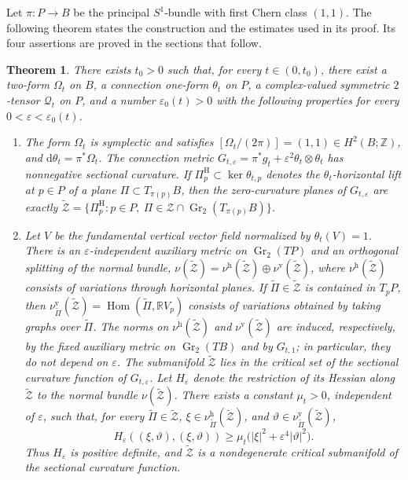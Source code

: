 \documentclass[11pt]{article}
\newtheorem{theorem}{Theorem}[section]
\theoremstyle{definition}
\theoremstyle{remark}
\newcommand{\R}{\mathbb R}
\newcommand{\Z}{\mathbb Z}
\newcommand{\cZ}{\mathcal Z}
\newcommand{\tZ}{\widetilde{\mathcal Z}}
\newcommand{\Gr}{\operatorname{Gr}}
\newcommand{\dd}{\mathrm d}
\newcommand{\eps}{\varepsilon}
\begin{document}
Let $\pi:P\to B$ be the principal $S^1$-bundle with first Chern class
$(1,1)$.  The following theorem states the construction and the estimates used
in its proof.  Its four assertions are proved in the sections that follow.

\begin{theorem}                                                                     \label{thm:construction}
There exists $t_0>0$ such that, for every $t\in(0,t_0)$, there exist a two-form
$\Omega_t$ on $B$, a connection one-form $\theta_t$ on $P$, a complex-valued
symmetric $2$-tensor $\mathcal Q_t$ on $P$, and a number
$\eps_0(t)>0$ with the following properties for every
$0<\eps<\eps_0(t)$.

\begin{enumerate}
\item The form $\Omega_t$ is symplectic and satisfies
$[\Omega_t/(2\pi)]=(1,1)\in H^2(B;\Z)$, and
$\dd\theta_t=\pi^*\Omega_t$.  The connection metric
$G_{t,\eps}=\pi^*g_t+\eps^2\theta_t\otimes\theta_t$ has nonnegative
sectional curvature.  If $\Pi_p^{\mathrm H}\subset\ker\theta_{t,p}$ denotes the
$\theta_t$-horizontal lift at $p\in P$ of a plane
$\Pi\subset T_{\pi(p)}B$, then the zero-curvature planes of $G_{t,\eps}$ are
exactly $\tZ=\{\Pi_p^{\mathrm H}:p\in P,\ \Pi\in\cZ\cap\Gr_2(T_{\pi(p)}B)\}$.

\item Let $V$ be the fundamental vertical vector field normalized by
$\theta_t(V)=1$.  There is an
$\eps$-independent auxiliary metric on $\Gr_2(TP)$ and an orthogonal
splitting of the normal bundle,
$\nu(\tZ)=\nu^{\mathrm h}(\tZ)\oplus\nu^{\mathrm v}(\tZ)$, where
$\nu^{\mathrm h}(\tZ)$ consists of variations through horizontal planes.  If
$\widetilde\Pi\in\tZ$ is contained in $T_pP$, then
$\nu^{\mathrm v}_{\widetilde\Pi}(\tZ)
=\operatorname{Hom}(\widetilde\Pi,\R V_p)$ consists
of variations obtained by taking graphs over $\widetilde\Pi$.  The norms
on $\nu^{\mathrm h}(\tZ)$ and $\nu^{\mathrm v}(\tZ)$ are induced,
respectively, by the fixed auxiliary metric on $\Gr_2(TB)$ and by $G_{t,1}$;
in particular, they do not depend on $\eps$.
The submanifold $\tZ$ lies in the critical set of the sectional curvature
function of $G_{t,\eps}$.  Let $H_\eps$ denote the restriction of its Hessian
along $\tZ$ to the normal bundle $\nu(\tZ)$.  There exists a constant
$\mu_t>0$, independent of $\eps$, such that, for every
$\widetilde\Pi\in\tZ$, $\xi\in\nu^{\mathrm h}_{\widetilde\Pi}(\tZ)$, and
$\vartheta\in\nu^{\mathrm v}_{\widetilde\Pi}(\tZ)$,
\[
 H_\eps((\xi,\vartheta),(\xi,\vartheta))
 \geq \mu_t\bigl(|\xi|^2+\eps^4|\vartheta|^2\bigr).
\]
Thus $H_\eps$ is positive definite, and $\tZ$ is a nondegenerate critical
submanifold of the sectional curvature function.


\end{enumerate}
\end{theorem}
\end{document}
